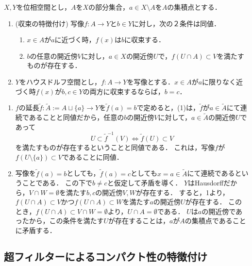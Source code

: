 \documentclass[uplatex,dvipdfmx]{jsreport}
\begin{document}
\begin{proposition}[Hausdorff空間では極限は一意的]\label{prop-uniqueness-of-limit-in-Hausdorff-space}
    $X,Y$を位相空間とし，$A$を$X$の部分集合，$a\in X\setminus A$を$A$の集積点とする．
    \begin{enumerate}
        \item (収束の特徴付け) 写像$f:A\to Y$と$b\in Y$に対し，次の２条件は同値．
        \begin{enumerate}[(1)]
            \item $x\in A$が$a$に近づく時，$f(x)$は$b$に収束する．
            \item $b$の任意の開近傍$V$に対し，$a\in X$の開近傍$U$で，$f(U\cap A)\subset V$を満たすものが存在する．
        \end{enumerate}
        \item $Y$をハウスドルフ空間とし，$f:A\to Y$を写像とする．$x\in A$が$a$に限りなく近づく時$f(x)$が$b,c\in Y$の両方に収束するならば，$b=c$．
    \end{enumerate}
\end{proposition}
\begin{Proof}\mbox{}
    \begin{enumerate}
        \item $f$の延長$\widetilde{f}:\widetilde{A}:=A\sqcup\{a\}\to Y$を$\widetilde{f}(a)=b$で定めると，(1)は，$\widetilde{f}$が$a\in\widetilde{A}$にて連続であることと同値だから，任意の$b$の開近傍$V$に対して，$a\in\widetilde{A}$の開近傍$U$であって
        \[U\subset\widetilde{f}^{-1}(V)\Leftrightarrow \widetilde{f}(U)\subset V\]
        を満たすものが存在するということと同値である．
        これは，写像$f$が$f(U\setminus\{a\})\subset V$であることに同値．
        \item 
        写像を$\widetilde{f}(a)=b$としても，$\widetilde{f}(a)=c$としても$x=a\in\widetilde{A}$にて連続であるということである．
        この下で$b\ne c$と仮定して矛盾を導く．
        $Y$はHausdorffだから，$V\cap W=\emptyset$を満たす$b,c$の開近傍$V,W$が存在する．
        すると，1より，$f(U\cap A)\subset V$かつ$f(U\cap A)\subset W$を満たす$a$の開近傍$U$が存在する．
        このとき，$f(U\cap A)\subset V\cap W=\emptyset$より，$U\cap A=\emptyset$である．
        $U$は$a$の開近傍であったから，この条件を満たす$U$が存在することは，$a$が$A$の集積点であることに矛盾する．
    \end{enumerate}
\end{Proof}

\subsection{超フィルターによるコンパクト性の特徴付け}
\end{document}
